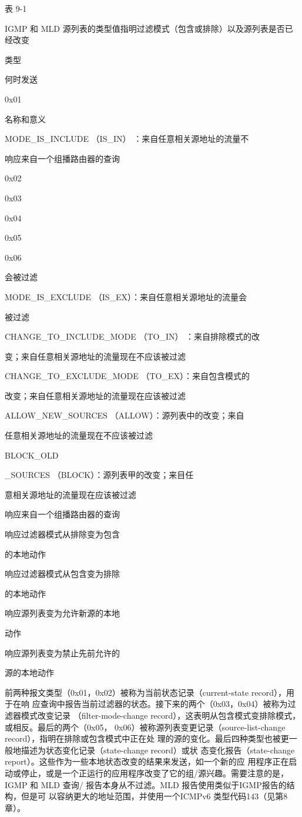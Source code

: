表 9-1

IGMP 和 MLD 源列表的类型值指明过滤模式（包含或排除）以及源列表是否已经改变

类型

何时发送

0x01

名称和意义

MODE\_IS\_INCLUDE （IS\_IN） ：来自任意相关源地址的流量不

响应来自一个组播路由器的查询

0x02

0x03

0x04

0x05

0x06

会被过滤

MODE\_IS\_EXCLUDE （IS\_EX）：来自任意相关源地址的流量会

被过滤

CHANGE\_TO\_INCLUDE\_MODE （TO\_IN） ：来自排除模式的改

变；来自任意相关源地址的流量现在不应该被过滤

CHANGE\_TO\_EXCLUDE\_MODE （TO\_EX）：来自包含模式的

改变；来自任意相关源地址的流量现在应该被过滤

ALLOW\_NEW\_SOURCES （ALLOW）：源列表中的改变；来自

任意相关源地址的流量现在不应该被过滤

BLOCK\_OLD

\_SOURCES （BLOCK）：源列表甲的改变；来目任

意相关源地址的流量现在应该被过滤

响应来自一个组播路由器的查询

响应过滤器模式从排除变为包含

的本地动作

响应过滤器模式从包含变为排除

的本地动作

响应源列表变为允许新源的本地

动作

响应源列表变为禁止先前允许的

源的本地动作

前两种报文类型（0x01，0x02）被称为当前状态记录（current-state record），用于在响
应查询中报告当前过滤器的状态。接下来的两个（0x03，0x04）被称为过滤器模式改变记录
（filter-mode-change record），这表明从包含模式变排除模式，或相反。最后的两个（0x05，
0x06）被称源列表变更记录（source-list-change record），指明在排除或包含模式中正在处
理的源的变化。最后四种类型也被更一般地描述为状态变化记录（state-change record）或状
态变化报告（state-change report）。这些作为一些本地状态改变的结果来发送，如一个新的应
用程序正在启动或停止，或是一个正运行的应用程序改变了它的组/源兴趣。需要注意的是，
IGMP 和 MLD 查询/ 报告本身从不过滤。MLD 报告使用类似于IGMP报告的结构，但是可
以容纳更大的地址范围，并使用一个ICMPv6 类型代码143（见第8章）。

